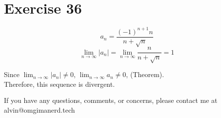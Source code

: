 \documentclass[letterpaper, 12pt]{math}
\begin{document}
\section*{Exercise 36}
\[ a_{n} = \frac{(-1)^{n+1}n}{n+\sqrt{n}} \]
\[ \lim_{n\to\infty}{|a_{n}|} = \lim_{n\to\infty}{\frac{n}{n+\sqrt{n}}} = 1 \]
\begin{center}
  Since \( \lim_{n\to\infty}{|a_{n}|} \neq 0 \),
  \( \lim_{n\to\infty}{a_{n}} \neq 0 \), (Theorem). \\
  Therefore, this sequence is divergent.
\end{center}

\begin{center}
  If you have any questions, comments, or concerns, please contact me at
  alvin@omgimanerd.tech
\end{center}
\end{document}
